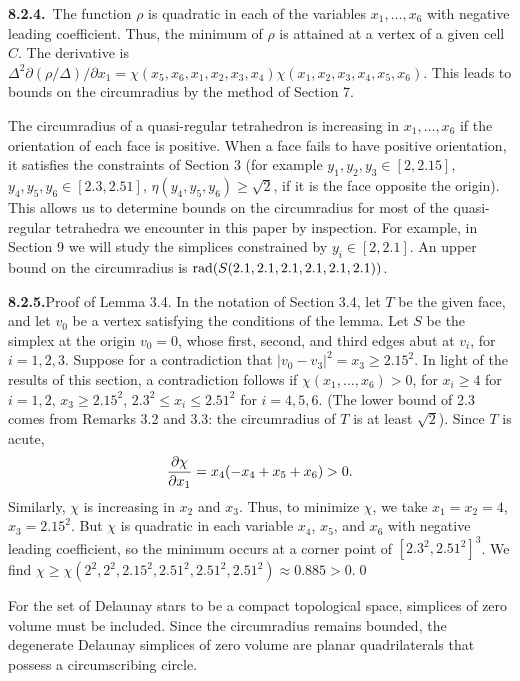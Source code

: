 {\bf 8.2.4.}\ The function
 $\rho$ is quadratic in each of the variables $x_1,\ldots,x_6$ with
negative leading coefficient. Thus,
the minimum of $\rho$ is attained at a vertex of a given cell $C$.
The derivative is
$\Delta^2 \partial(\rho/\Delta)/\partial x_1 = 
\chi(x_5,x_6,x_1,x_2,x_3,x_4)\chi(x_1,x_2,x_3,x_4,x_5,x_6)$.
This leads to bounds on the circumradius by the method of
Section 7.

The circumradius of a quasi-regular tetrahedron is increasing
in $x_1,\ldots,x_6$ if the orientation of each face is positive.
When a face fails to have positive orientation, it satisfies
the constraints of Section 3 (for example $y_1,y_2,y_3\in [2,2.15]$,
$y_4,y_5,y_6\in [2.3,2.51]$, $\eta(y_4,y_5,y_6)\ge\sqrt{2}$, if
it is the face opposite the origin).
This allows us to determine bounds on the circumradius for
most of the quasi-regular tetrahedra
 we encounter in this paper by inspection.
For example, in Section 9 we will study the simplices constrained
by $y_i\in [2,2.1]$.  An upper bound on the circumradius is
$\operatorname{rad}(S(2.1,2.1,2.1,2.1,2.1,2.1))$.

\noindent
{\bf 8.2.5.}\quad Proof of Lemma 3.4.  In the notation of Section 3.4, 
let $T$ be the given face, and let $v_0$ be a vertex satisfying
the conditions of the lemma.
Let $S$ be the simplex at the origin $v_0=0$, whose first, second,
and third edges abut at $v_i$, for $i=1,2,3$.
Suppose for a contradiction that $|v_0-v_3|^2=x_3\ge 2.15^2$.
In light of the results of this section, a contradiction
follows if 
$\chi(x_1,\ldots,x_6)>0$, for
$x_i\ge 4$ for $i=1,2$, $x_3\ge 2.15^2$, $2.3^2\le x_i\le 2.51^2$
for $i=4,5,6$.
(The lower bound of 2.3 comes from Remarks
3.2 and 3.3: the circumradius of $T$ is at least $\sqrt{2}$).
Since $T$ is acute,
$${\partial\chi\over\partial x_1} = x_4 (-x_4+x_5+x_6)>0.$$
Similarly, $\chi$ is increasing in $x_2$ and $x_3$.  Thus, to
minimize $\chi$, we take $x_1=x_2=4$, $x_3=2.15^2$.
But $\chi$ is quadratic in each variable $x_4$, $x_5$, and $x_6$
with negative leading coefficient, so the minimum occurs at a corner
point of $[2.3^2,2.51^2]^3$.
We find $\chi\ge\chi(2^2,2^2,2.15^2,2.51^2,2.51^2,2.51^2)
\approx 0.885>0$.\qed

\medskip
For the set of Delaunay
stars to be a
compact topological space, simplices of zero volume
must be included.  
Since the circumradius remains bounded, the degenerate
Delaunay simplices of zero
volume are planar quadrilaterals that possess a circumscribing
circle.  

\bigskip

